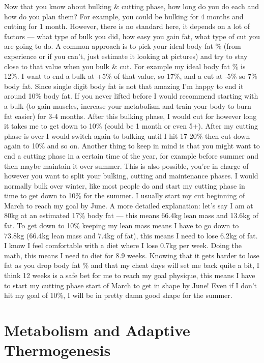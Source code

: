 \documentclass[openany, 12pt]{book}
\begin{document}
	Now that you know about bulking \& cutting phase, how long do you do each and how do you plan them? For example, you could be bulking for 4 months and cutting for 1 month.
	However, there is no standard here, it depends on a lot of factors --- what type of bulk you did, how easy you gain fat, what type of cut you are going to do. A common
	approach is to pick your ideal body fat \% (from experience or if you can't, just estimate it looking at pictures) and try to stay close to that value when you bulk \& cut.
	For example my ideal body fat \% is 12\%. I want to end a bulk at +5\% of that value, so 17\%, and a cut at -5\% so 7\% body fat. Since single digit body fat is not that 
	amazing I'm happy to end it around 10\% body fat. If you never lifted before I would recommend starting with a bulk (to gain muscles, increase your metabolism and train your
	body to burn fat easier) for 3-4 months. After this bulking phase, I would cut for however long it takes me to get down to 10\% (could be 1 month or even 5+). After my cutting
	phase is over I would switch again to bulking until I hit 17-20\% then cut down again to 10\% and so on. Another thing to keep in mind is that you might want to end a cutting
	phase in a certain time of the year, for example before summer and then maybe maintain it over summer. This is also possible, you're in charge of however you want to split your
	bulking, cutting and maintenance phases. I would normally bulk over winter, like most people do and start my cutting phase in time to get down to 10\% for the summer. I usually
	start my cut beginning of March to reach my goal by June. A more detailed explanation: let's say I am at 80kg at an estimated 17\% body fat --- this means 66.4kg lean mass and
	13.6kg of fat. To get down to 10\% keeping my lean mass means I have to go down to 73.8kg (66.4kg lean mass and 7.4kg of fat), this means I need to lose 6.2kg of fat. I know I 
	feel comfortable with a diet where I lose 0.7kg per week. Doing the math, this means I need to diet for 8.9 weeks. Knowing that it gets harder to lose fat as you drop body fat
	\% and that my cheat days will set me back quite a bit, I think 12 weeks is a safe bet for me to reach my goal physique, this means I have to start my cutting phase
	start of March to get in shape by June! Even if I don't hit my goal of 10\%, I will be in pretty damn good shape for the summer.

	\section{Metabolism and Adaptive Thermogenesis}
	
\end{document}

